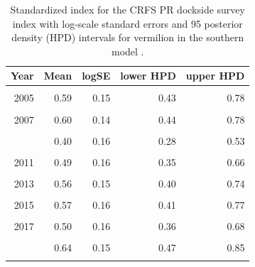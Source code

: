 \documentclass[
  english,
  a4paper,
]{article}
\begin{document}
\begin{table}

\caption{\label{tab:tab-index-crfspr}Standardized index for the CRFS PR dockside survey index with log-scale standard errors and 95%
       posterior density (HPD) intervals for vermilion in the southern model .}
\centering
\begin{tabular}[t]{rrrrr}
\toprule
Year & Mean & logSE & lower HPD & upper HPD\\
\midrule
\cellcolor{gray!6}{2004} & \cellcolor{gray!6}{0.99} & \cellcolor{gray!6}{0.14} & \cellcolor{gray!6}{0.74} & \cellcolor{gray!6}{1.27}\\
2005 & 0.59 & 0.15 & 0.43 & 0.78\\
\cellcolor{gray!6}{2006} & \cellcolor{gray!6}{0.55} & \cellcolor{gray!6}{0.15} & \cellcolor{gray!6}{0.41} & \cellcolor{gray!6}{0.74}\\
2007 & 0.60 & 0.14 & 0.44 & 0.78\\
\cellcolor{gray!6}{2008} & \cellcolor{gray!6}{0.46} & \cellcolor{gray!6}{0.15} & \cellcolor{gray!6}{0.34} & \cellcolor{gray!6}{0.61}\\
\addlinespace
2009 & 0.40 & 0.16 & 0.28 & 0.53\\
\cellcolor{gray!6}{2010} & \cellcolor{gray!6}{0.41} & \cellcolor{gray!6}{0.16} & \cellcolor{gray!6}{0.29} & \cellcolor{gray!6}{0.56}\\
2011 & 0.49 & 0.16 & 0.35 & 0.66\\
\cellcolor{gray!6}{2012} & \cellcolor{gray!6}{0.47} & \cellcolor{gray!6}{0.17} & \cellcolor{gray!6}{0.33} & \cellcolor{gray!6}{0.64}\\
2013 & 0.56 & 0.15 & 0.40 & 0.74\\
\addlinespace
\cellcolor{gray!6}{2014} & \cellcolor{gray!6}{0.59} & \cellcolor{gray!6}{0.15} & \cellcolor{gray!6}{0.43} & \cellcolor{gray!6}{0.79}\\
2015 & 0.57 & 0.16 & 0.41 & 0.77\\
\cellcolor{gray!6}{2016} & \cellcolor{gray!6}{0.50} & \cellcolor{gray!6}{0.16} & \cellcolor{gray!6}{0.35} & \cellcolor{gray!6}{0.67}\\
2017 & 0.50 & 0.16 & 0.36 & 0.68\\
\cellcolor{gray!6}{2018} & \cellcolor{gray!6}{0.44} & \cellcolor{gray!6}{0.17} & \cellcolor{gray!6}{0.31} & \cellcolor{gray!6}{0.60}\\
\addlinespace
2019 & 0.64 & 0.15 & 0.47 & 0.85\\
\cellcolor{gray!6}{2020} & \cellcolor{gray!6}{0.51} & \cellcolor{gray!6}{0.24} & \cellcolor{gray!6}{0.31} & \cellcolor{gray!6}{0.78}\\
\bottomrule
\end{tabular}
\end{table}
\end{document}
